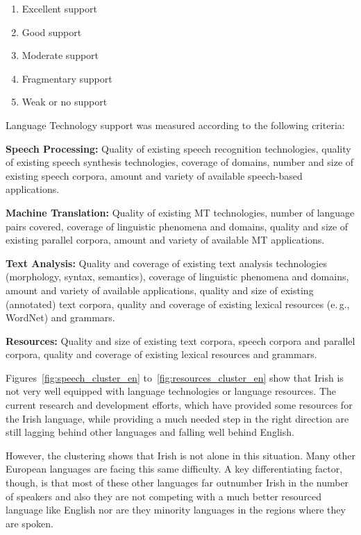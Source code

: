 \documentclass[]{../../metanetpaper}
\begin{document}
\begin{multicols}{2}
\begin{enumerate}
\item Excellent support
\item Good support
\item Moderate support
\item Fragmentary support
\item Weak or no support
\end{enumerate}

Language Technology support was measured according to the following criteria:

\textbf{Speech Processing:} Quality of existing speech recognition technologies, quality of existing speech synthesis technologies, coverage of domains, number and size of existing speech corpora, amount and variety of available speech-based applications.

\textbf{Machine Translation:} Quality of existing MT technologies, number of language pairs covered, coverage of linguistic phenomena and domains, quality and size of existing parallel corpora, amount and variety of available MT applications.

\textbf{Text Analysis:} Quality and coverage of existing text analysis technologies (morphology, syntax, semantics), coverage of linguistic phenomena and domains, amount and variety of available applications, quality and size of existing (annotated) text corpora, quality and coverage of existing lexical resources (e.\,g., WordNet) and grammars.

\textbf{Resources:} Quality and size of existing text corpora, speech corpora and parallel corpora, quality and coverage of existing lexical resources and grammars.

Figures~\ref{fig:speech_cluster_en} to~\ref{fig:resources_cluster_en} show that Irish is not very well equipped with language technologies or language resources. The current research and development efforts, which have provided some resources for the Irish language, while providing a much needed step in the right direction are still lagging behind other languages and falling well behind English.

However, the clustering shows that Irish is not alone in this situation. Many other European languages are facing this same difficulty. A key differentiating factor, though, is that most of these other languages far outnumber Irish in the number of speakers and also they are not competing with a much better resourced language like English nor are they minority languages in the regions where they are spoken.


\end{multicols}
\end{document}
